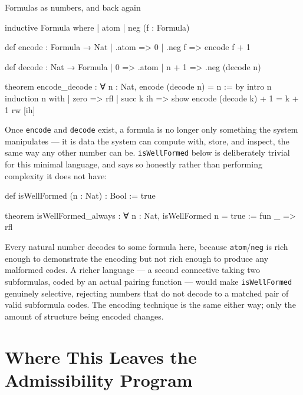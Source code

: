 \begin{experiment}{Formulas as numbers, and back again}
\begin{lean}
inductive Formula where
  | atom
  | neg (f : Formula)

def encode : Formula → Nat
  | .atom => 0
  | .neg f => encode f + 1

def decode : Nat → Formula
  | 0 => .atom
  | n + 1 => .neg (decode n)

theorem encode_decode : ∀ n : Nat, encode (decode n) = n := by
  intro n
  induction n with
  | zero => rfl
  | succ k ih =>
    show encode (decode k) + 1 = k + 1
    rw [ih]
\end{lean}
Once \texttt{encode} and \texttt{decode} exist, a formula is no
longer only something the system manipulates — it is data the
system can compute with, store, and inspect, the same way any other
number can be. \texttt{isWellFormed} below is deliberately trivial
for this minimal language, and says so honestly rather than
performing complexity it does not have:
\begin{lean}
def isWellFormed (n : Nat) : Bool := true

theorem isWellFormed_always : ∀ n : Nat, isWellFormed n = true :=
  fun _ => rfl
\end{lean}
Every natural number decodes to some formula here, because
\texttt{atom}/\texttt{neg} is rich enough to demonstrate the
encoding but not rich enough to produce any malformed codes. A
richer language — a second connective taking two subformulas, coded
by an actual pairing function — would make \texttt{isWellFormed}
genuinely selective, rejecting numbers that do not decode to a
matched pair of valid subformula codes. The encoding technique is
the same either way; only the amount of structure being encoded
changes.
\end{experiment}

\section{Where This Leaves the Admissibility Program}

